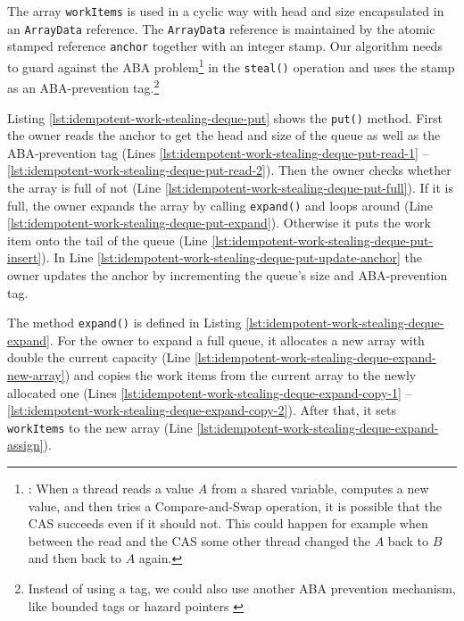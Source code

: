 The array \lstinline!workItems! is used in a cyclic way with head and
size encapsulated in an \lstinline!ArrayData! reference. The
\lstinline!ArrayData! reference is maintained by the atomic stamped
reference \lstinline!anchor! together with an integer stamp. Our
algorithm needs to guard against the ABA
problem\footnote{\cite{Michael1996}: When a thread reads a value $A$
  from a shared variable, computes a new value, and then tries a
  Compare-and-Swap operation, it is possible that the CAS succeeds
  even if it should not. This could happen for example when between
  the read and the CAS some other thread changed the $A$ back to $B$
  and then back to $A$ again.} in the \lstinline!steal()!  operation
and uses the stamp as an ABA-prevention tag.\footnote{Instead of using
  a tag, we could also use another ABA prevention mechanism, like
  bounded tags \cite{Moir1997} or hazard pointers \cite{Michael2004}}

Listing \ref{lst:idempotent-work-stealing-deque-put} shows the
\lstinline!put()! method. First the owner reads the anchor to get the
head and size of the queue as well as the ABA-prevention tag (Lines
\ref{lst:idempotent-work-stealing-deque-put-read-1} --
\ref{lst:idempotent-work-stealing-deque-put-read-2}). Then the owner
checks whether the array is full of not (Line
\ref{lst:idempotent-work-stealing-deque-put-full}). If it is full, the
owner expands the array by calling \lstinline!expand()! and loops
around (Line
\ref{lst:idempotent-work-stealing-deque-put-expand}). Otherwise it
puts the work item onto the tail of the queue (Line
\ref{lst:idempotent-work-stealing-deque-put-insert}). In Line
\ref{lst:idempotent-work-stealing-deque-put-update-anchor} the owner
updates the anchor by incrementing the queue's size and ABA-prevention
tag.



The method \lstinline!expand()! is defined in Listing
\ref{lst:idempotent-work-stealing-deque-expand}. For the owner to
expand a full queue, it allocates a new array with double the current
capacity (Line
\ref{lst:idempotent-work-stealing-deque-expand-new-array}) and copies
the work items from the current array to the newly allocated one
(Lines \ref{lst:idempotent-work-stealing-deque-expand-copy-1} --
\ref{lst:idempotent-work-stealing-deque-expand-copy-2}). After that,
it sets \lstinline!workItems! to the new array (Line
\ref{lst:idempotent-work-stealing-deque-expand-assign}).

